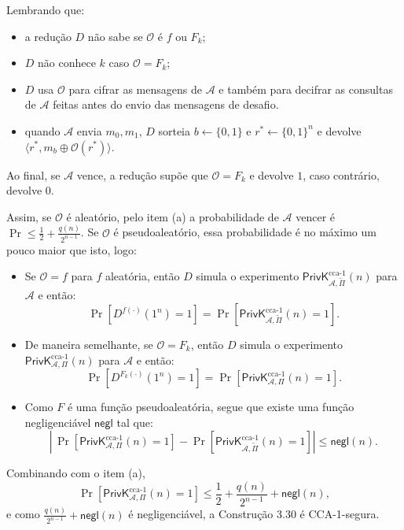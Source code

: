 \documentclass[11pt,a4paper]{article}
\newcommand{\negl}{\mathsf{negl}}
\newcommand{\PrivKccaI}[3]{\mathsf{PrivK}^{\mathrm{cca}\text{-}1}_{#1,#2}(#3)}
\begin{document}
    Lembrando que:
    \begin{itemize}
        \item a redução $D$ não sabe se $\mathcal{O}$ é $f$ ou $F_k$;
        \item $D$ não conhece $k$ caso $\mathcal{O} = F_k$;
        \item $D$ usa $\mathcal{O}$ para cifrar as mensagens de $\mathcal{A}$ e
        também para decifrar as consultas de $\mathcal{A}$ feitas antes do envio das
        mensagens de desafio.
        \item quando $\mathcal{A}$ envia $m_0, m_1$, $D$ sorteia $b \leftarrow \{0,1\}$ e
        $r^{*} \leftarrow \{0,1\}^n$ e devolve $\langle r^{*}, m_b \oplus \mathcal{O}(r^{*}) \rangle$.
    \end{itemize}

    Ao final, se $\mathcal{A}$ vence, a redução supõe que $\mathcal{O} = F_k$ e devolve $1$,
    caso contrário, devolve $0$.

    Assim, se $\mathcal{O}$ é aleatório, pelo item (a) a probabilidade de $\mathcal{A}$ vencer é
    $\Pr \le \frac{1}{2} + \frac{q(n)}{2^{n-1}}$. Se $\mathcal{O}$ é pseudoaleatório, essa
    probabilidade é no máximo um pouco maior que isto, logo:

    \begin{itemize}
        \item Se $\mathcal{O} = f$ para $f$ aleatória, então $D$ simula o experimento
        $\PrivKccaI{\mathcal{A}}{\tilde{\Pi}}{n}$ para $\mathcal{A}$ e então:
        \[
            \Pr\!\left[D^{f(\cdot)}(1^n) = 1\right]
            = \Pr\!\left[\PrivKccaI{\mathcal{A}}{\tilde{\Pi}}{n} = 1\right].
        \]
        \item De maneira semelhante, se $\mathcal{O} = F_k$, então $D$ simula o
        experimento $\PrivKccaI{\mathcal{A}}{\Pi}{n}$ para $\mathcal{A}$ e então:
        \[
            \Pr\!\left[D^{F_k(\cdot)}(1^n) = 1\right]
            = \Pr\!\left[\PrivKccaI{\mathcal{A}}{\Pi}{n} = 1\right].
        \]
        \item Como $F$ é uma função pseudoaleatória, segue que existe uma função negligenciável $\negl$
        tal que:
        \[
            \left|\,\Pr\!\left[\PrivKccaI{\mathcal{A}}{\Pi}{n} = 1\right]
                - \Pr\!\left[\PrivKccaI{\mathcal{A}}{\tilde{\Pi}}{n} = 1\right]\right|
            \le \negl(n).
        \]
    \end{itemize}

    Combinando com o item (a),
    \[
        \Pr\!\left[\PrivKccaI{\mathcal{A}}{\Pi}{n} = 1\right]
        \le \frac{1}{2} + \frac{q(n)}{2^{n-1}} + \negl(n),
    \]
    e como $\frac{q(n)}{2^{n-1}} + \negl(n)$ é negligenciável, a Construção 3.30 é
    CCA-1-segura.
\end{document}
